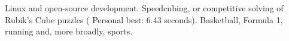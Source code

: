 \documentclass[10pt,a4paper]{article} %
\begin{document}

    \spacedhrule{1.6em}{-0.4em} %


    {Linux and open-source development. Speedcubing, or competitive solving of Rubik's Cube puzzles (
        Personal best: 6.43 seconds). Basketball, Formula 1, running and, more broadly, sports.}

\end{document}
